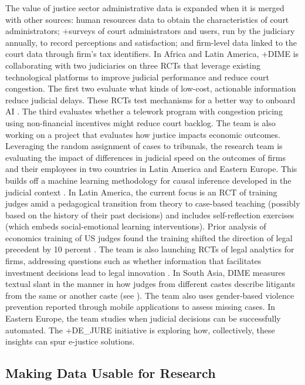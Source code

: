 \documentclass[
]{WileySix}
\begin{document}
The value of justice sector administrative data is expanded when it is merged with other sources: human resources data to obtain the characteristics of court administrators; +surveys\textbar{} of court administrators and users, run by the judiciary annually, to record perceptions and satisfaction; and firm-level data linked to the court data through firm's tax identifiers. In Africa and Latin America, +DIME\textbar{} is collaborating with two judiciaries on three RCTs that leverage existing technological platforms to improve judicial performance and reduce court congestion. The first two evaluate what kinds of low-cost, actionable information reduce judicial delays. These RCTs test mechanisms for a better way to onboard AI \citep[see][]{babic2020}. The third evaluates whether a telework program with congestion pricing using non-financial incentives might reduce court backlog. The team is also working on a project that evaluates how justice impacts economic outcomes. Leveraging the random assignment of cases to tribunals, the research team is evaluating the impact of differences in judicial speed on the outcomes of firms and their employees in two countries in Latin America and Eastern Europe. This builds off a machine learning methodology for causal inference developed in the judicial context \citep[see][]{babic2020}. In Latin America, the current focus is an RCT of training judges amid a pedagogical transition from theory to case-based teaching (possibly based on the history of their past decisions) and includes self-reflection exercises (which embeds social-emotional learning interventions). Prior analysis of economics training of US judges found the training shifted the direction of legal precedent by 10 percent \citep{galletta2019}. The team is also launching RCTs of legal analytics for firms, addressing questions such as whether information that facilitates investment decisions lead to legal innovation \citep{chen2015}. In South Asia, DIME measures textual slant in the manner in how judges from different castes describe litigants from the same or another caste (see \citet{ash2019}). The team also uses gender-based violence prevention reported through mobile applications to assess missing cases. In Eastern Europe, the team studies when judicial decisions can be successfully automated. The +DE\_JURE\textbar{} initiative is exploring how, collectively, these insights can spur e-justice solutions.

\hypertarget{making-data-usable-for-research-6}{%
\subsection{Making Data Usable for Research}\label{making-data-usable-for-research-6}}
\end{document}
